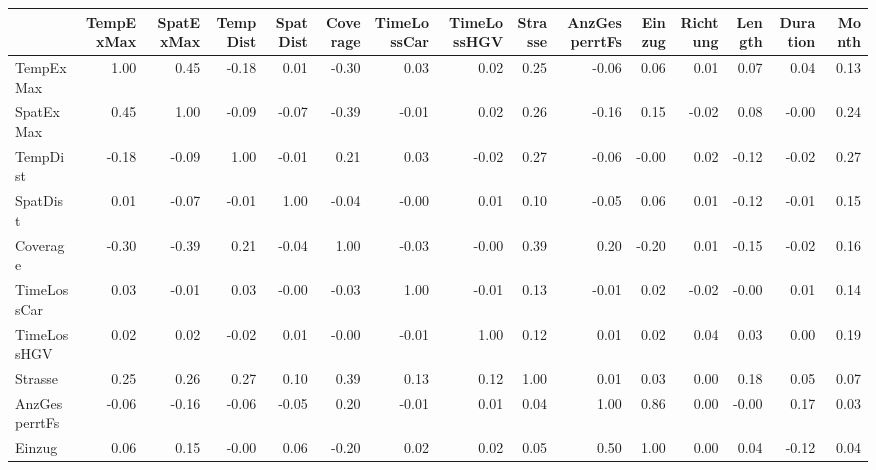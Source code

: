 \begin{tabular}{lrrrrrrrrrrrrrr}
\toprule
{} &  TempExMax &  SpatExMax &  TempDist &  SpatDist &  Coverage &  TimeLossCar &  TimeLossHGV &  Strasse &  AnzGesperrtFs &  Einzug &  Richtung &  Length &  Duration &  Month \\
\midrule
TempExMax     &       1.00 &       0.45 &     -0.18 &      0.01 &     -0.30 &         0.03 &         0.02 &     0.25 &          -0.06 &    0.06 &      0.01 &    0.07 &      0.04 &   0.13 \\
SpatExMax     &       0.45 &       1.00 &     -0.09 &     -0.07 &     -0.39 &        -0.01 &         0.02 &     0.26 &          -0.16 &    0.15 &     -0.02 &    0.08 &     -0.00 &   0.24 \\
TempDist      &      -0.18 &      -0.09 &      1.00 &     -0.01 &      0.21 &         0.03 &        -0.02 &     0.27 &          -0.06 &   -0.00 &      0.02 &   -0.12 &     -0.02 &   0.27 \\
SpatDist      &       0.01 &      -0.07 &     -0.01 &      1.00 &     -0.04 &        -0.00 &         0.01 &     0.10 &          -0.05 &    0.06 &      0.01 &   -0.12 &     -0.01 &   0.15 \\
Coverage      &      -0.30 &      -0.39 &      0.21 &     -0.04 &      1.00 &        -0.03 &        -0.00 &     0.39 &           0.20 &   -0.20 &      0.01 &   -0.15 &     -0.02 &   0.16 \\
TimeLossCar   &       0.03 &      -0.01 &      0.03 &     -0.00 &     -0.03 &         1.00 &        -0.01 &     0.13 &          -0.01 &    0.02 &     -0.02 &   -0.00 &      0.01 &   0.14 \\
TimeLossHGV   &       0.02 &       0.02 &     -0.02 &      0.01 &     -0.00 &        -0.01 &         1.00 &     0.12 &           0.01 &    0.02 &      0.04 &    0.03 &      0.00 &   0.19 \\
Strasse       &       0.25 &       0.26 &      0.27 &      0.10 &      0.39 &         0.13 &         0.12 &     1.00 &           0.01 &    0.03 &      0.00 &    0.18 &      0.05 &   0.07 \\
AnzGesperrtFs &      -0.06 &      -0.16 &     -0.06 &     -0.05 &      0.20 &        -0.01 &         0.01 &     0.04 &           1.00 &    0.86 &      0.00 &   -0.00 &      0.17 &   0.03 \\
Einzug        &       0.06 &       0.15 &     -0.00 &      0.06 &     -0.20 &         0.02 &         0.02 &     0.05 &           0.50 &    1.00 &      0.00 &    0.04 &     -0.12 &   0.04 \\

\end{tabular}
